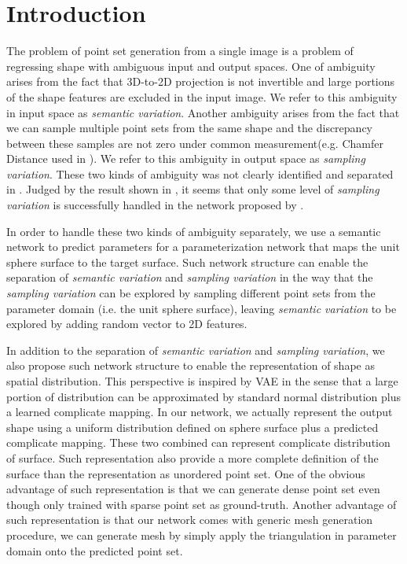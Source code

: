 \section{Introduction}
The problem of point set generation from a single image is a problem of regressing shape with ambiguous input and output spaces. One of ambiguity arises from the fact that 3D-to-2D projection is not invertible and large portions of the shape features are excluded in the input image. We refer to this ambiguity in input space as \textit{semantic variation}. Another ambiguity arises from the fact that we can sample multiple point sets from the same shape and the discrepancy between these samples are not zero under common measurement(e.g. Chamfer Distance used in \cite{PSGN}). We refer to this ambiguity in output space as \textit{sampling variation}. These two kinds of ambiguity was not clearly identified and separated in \cite{PSGN}. Judged by the result shown in \cite{PSGN}, it seems that only some level of \textit{sampling variation} is successfully handled in the network proposed by \cite{PSGN}.

In order to handle these two kinds of ambiguity separately, we use a semantic network to predict parameters for a parameterization network that maps the unit sphere surface to the target surface. Such network structure can enable the separation of \textit{semantic variation} and \textit{sampling variation} in the way that the \textit{sampling variation} can be explored by sampling different point sets from the parameter domain (i.e. the unit sphere surface), leaving \textit{semantic variation} to be explored by adding random vector to 2D features.

In addition to the separation of \textit{semantic variation} and \textit{sampling variation}, we also propose such network structure to enable the representation of shape as spatial distribution. This perspective is inspired by VAE\cite{VAE} in the sense that a large portion of distribution can be approximated by standard normal distribution plus a learned complicate mapping. In our network, we actually represent the output shape using a uniform distribution defined on sphere surface plus a predicted complicate mapping. These two combined can represent complicate distribution of surface. Such representation also provide a more complete definition of the surface than the representation as unordered point set. One of the obvious advantage of such representation is that we can generate dense point set even though only trained with sparse point set as ground-truth. Another advantage of such representation is that our network comes with generic mesh generation procedure, we can generate mesh by simply apply the triangulation in parameter domain onto the predicted point set.

